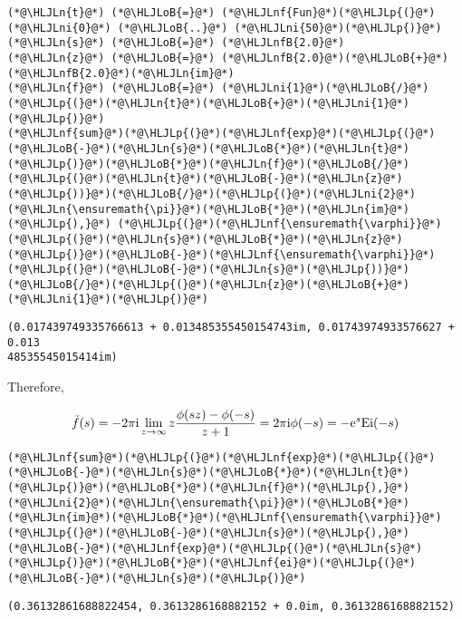 \documentclass[12pt,landscape]{article}
\newcommand{\HLJLn}[1]{#1}
\newcommand{\HLJLnf}[1]{\textcolor[RGB]{66,102,213}{#1}}
\newcommand{\HLJLnfB}[1]{\textcolor[RGB]{59,151,46}{#1}}
\newcommand{\HLJLni}[1]{\textcolor[RGB]{59,151,46}{#1}}
\newcommand{\HLJLoB}[1]{\textcolor[RGB]{102,102,102}{\textbf{#1}}}
\newcommand{\HLJLp}[1]{#1}
\def\I{ {\rm i} }
\def\E{ {\rm e} }
\begin{document}
{\begin{lstlisting}
(*@\HLJLn{t}@*) (*@\HLJLoB{=}@*) (*@\HLJLnf{Fun}@*)(*@\HLJLp{(}@*)(*@\HLJLni{0}@*) (*@\HLJLoB{..}@*) (*@\HLJLni{50}@*)(*@\HLJLp{)}@*)
(*@\HLJLn{s}@*) (*@\HLJLoB{=}@*) (*@\HLJLnfB{2.0}@*)
(*@\HLJLn{z}@*) (*@\HLJLoB{=}@*) (*@\HLJLnfB{2.0}@*)(*@\HLJLoB{+}@*)(*@\HLJLnfB{2.0}@*)(*@\HLJLn{im}@*)
(*@\HLJLn{f}@*) (*@\HLJLoB{=}@*) (*@\HLJLni{1}@*)(*@\HLJLoB{/}@*)(*@\HLJLp{(}@*)(*@\HLJLn{t}@*)(*@\HLJLoB{+}@*)(*@\HLJLni{1}@*)(*@\HLJLp{)}@*)
(*@\HLJLnf{sum}@*)(*@\HLJLp{(}@*)(*@\HLJLnf{exp}@*)(*@\HLJLp{(}@*)(*@\HLJLoB{-}@*)(*@\HLJLn{s}@*)(*@\HLJLoB{*}@*)(*@\HLJLn{t}@*)(*@\HLJLp{)}@*)(*@\HLJLoB{*}@*)(*@\HLJLn{f}@*)(*@\HLJLoB{/}@*)(*@\HLJLp{(}@*)(*@\HLJLn{t}@*)(*@\HLJLoB{-}@*)(*@\HLJLn{z}@*)(*@\HLJLp{))}@*)(*@\HLJLoB{/}@*)(*@\HLJLp{(}@*)(*@\HLJLni{2}@*)(*@\HLJLn{\ensuremath{\pi}}@*)(*@\HLJLoB{*}@*)(*@\HLJLn{im}@*)(*@\HLJLp{),}@*) (*@\HLJLp{(}@*)(*@\HLJLnf{\ensuremath{\varphi}}@*)(*@\HLJLp{(}@*)(*@\HLJLn{s}@*)(*@\HLJLoB{*}@*)(*@\HLJLn{z}@*)(*@\HLJLp{)}@*)(*@\HLJLoB{-}@*)(*@\HLJLnf{\ensuremath{\varphi}}@*)(*@\HLJLp{(}@*)(*@\HLJLoB{-}@*)(*@\HLJLn{s}@*)(*@\HLJLp{))}@*)(*@\HLJLoB{/}@*)(*@\HLJLp{(}@*)(*@\HLJLn{z}@*)(*@\HLJLoB{+}@*)(*@\HLJLni{1}@*)(*@\HLJLp{)}@*)
\end{lstlisting}

\begin{lstlisting}
(0.017439749335766613 + 0.013485355450154743im, 0.01743974933576627 + 0.013
48535545015414im)
\end{lstlisting}


Therefore,

\[
\check f(s) = -2 \pi \I  \lim_{z\rightarrow \infty} z {\phi(s z) - \phi(-s) \over z+1}  =
2 \pi \I \phi(-s) = -\E^{s} {\rm Ei}(-s)
\]

\begin{lstlisting}
(*@\HLJLnf{sum}@*)(*@\HLJLp{(}@*)(*@\HLJLnf{exp}@*)(*@\HLJLp{(}@*)(*@\HLJLoB{-}@*)(*@\HLJLn{s}@*)(*@\HLJLoB{*}@*)(*@\HLJLn{t}@*)(*@\HLJLp{)}@*)(*@\HLJLoB{*}@*)(*@\HLJLn{f}@*)(*@\HLJLp{),}@*) (*@\HLJLni{2}@*)(*@\HLJLn{\ensuremath{\pi}}@*)(*@\HLJLoB{*}@*)(*@\HLJLn{im}@*)(*@\HLJLoB{*}@*)(*@\HLJLnf{\ensuremath{\varphi}}@*)(*@\HLJLp{(}@*)(*@\HLJLoB{-}@*)(*@\HLJLn{s}@*)(*@\HLJLp{),}@*) (*@\HLJLoB{-}@*)(*@\HLJLnf{exp}@*)(*@\HLJLp{(}@*)(*@\HLJLn{s}@*)(*@\HLJLp{)}@*)(*@\HLJLoB{*}@*)(*@\HLJLnf{ei}@*)(*@\HLJLp{(}@*)(*@\HLJLoB{-}@*)(*@\HLJLn{s}@*)(*@\HLJLp{)}@*)
\end{lstlisting}

\begin{lstlisting}
(0.36132861688822454, 0.3613286168882152 + 0.0im, 0.3613286168882152)
\end{lstlisting}


}
\end{document}
